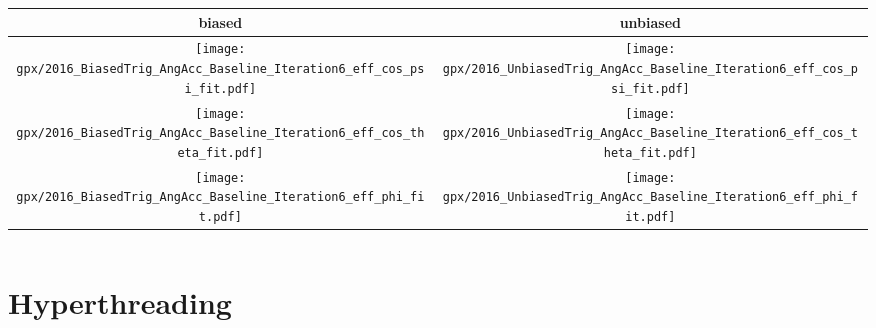 \documentclass[aspectratio=169,9pt,handout]{beamer}
\newcommand{\pdfnote}[1]{}
\begin{document}
\begin{frame}[default]
\begin{columns}
    \begin{column}{0.4\textwidth}
      \begin{tabular}{c|c}
        biased & unbiased \\ \hline
        \texttt{[image: gpx/2016\_BiasedTrig\_AngAcc\_Baseline\_Iteration6\_eff\_cos\_psi\_fit.pdf]}
        &
        \texttt{[image: gpx/2016\_UnbiasedTrig\_AngAcc\_Baseline\_Iteration6\_eff\_cos\_psi\_fit.pdf]} 
        \\
        \texttt{[image: gpx/2016\_BiasedTrig\_AngAcc\_Baseline\_Iteration6\_eff\_cos\_theta\_fit.pdf]} 
        &
        \texttt{[image: gpx/2016\_UnbiasedTrig\_AngAcc\_Baseline\_Iteration6\_eff\_cos\_theta\_fit.pdf]}
        \\
        \texttt{[image: gpx/2016\_BiasedTrig\_AngAcc\_Baseline\_Iteration6\_eff\_phi\_fit.pdf]} 
        &
        \texttt{[image: gpx/2016\_UnbiasedTrig\_AngAcc\_Baseline\_Iteration6\_eff\_phi\_fit.pdf]} 
      \end{tabular}
    \end{column}
  \end{columns}

\pdfnote{Here I show you some of our latest results, as a matter of fact, 2016 ones. I the table we can see how the angular accpetance weights look like. Basically they are one when the amplitude interferes with itself, and zero otherwise}
\pdfnote{Almost everithing in place but the valitation with B0 data, with in Currently ongoing}
\pdfnote{At right hand side we see these efficiencie ploted. These are just for ilustration, since we do not use legende polunomials to modell the acceptance. Here fourth-order polynomial parameterisation of each one-dimensional efficiency is used}

\end{frame} %



\section{Hyperthreading}
\end{document}
